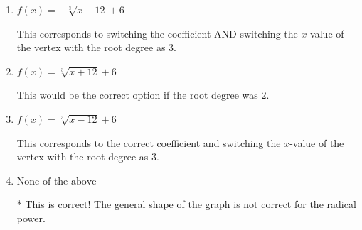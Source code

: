 \documentclass{extbook}[14pt]
\begin{document}
\begin{enumerate}
{\begin{enumerate}[label=\Alph*.]
This corresponds to switching the coefficient and having the correct vertex with the root degree as $3$.
\item \( f(x) = - \sqrt[3]{x - 12} + 6 \)

This corresponds to switching the coefficient AND switching the $x$-value of the vertex with the root degree as $3$.
\item \( f(x) = \sqrt[3]{x + 12} + 6 \)

This would be the correct option if the root degree was $2$.
\item \( f(x) = \sqrt[3]{x - 12} + 6 \)

This corresponds to the correct coefficient and switching the $x$-value of the vertex with the root degree as $3$.
\item \( \text{None of the above} \)

* This is correct! The general shape of the graph is not correct for the radical power.
\end{enumerate}

}
\end{enumerate}
\end{document}
